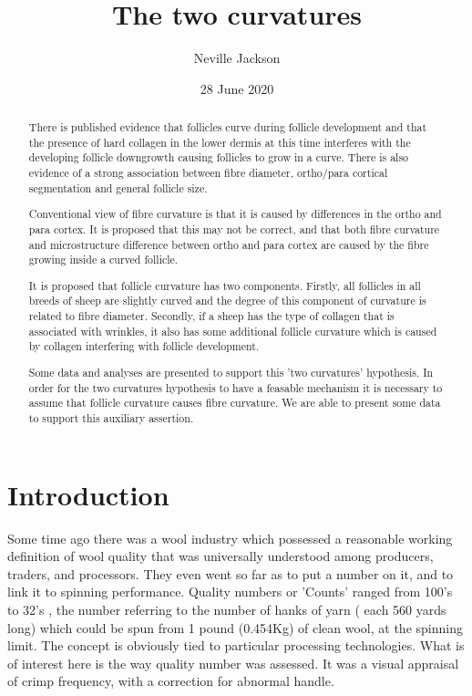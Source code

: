 \documentclass{article}
\begin{document}
\title{The two curvatures}
\author{Neville Jackson}
\date{28 June 2020}

\maketitle

\begin{abstract}

There is published evidence that follicles curve during follicle development and that the presence of hard collagen in the lower dermis at this time interferes with the developing follicle downgrowth causing follicles to grow in a curve.  
 There is also evidence of a strong association between fibre diameter, ortho/para cortical segmentation and general follicle size.

Conventional view of fibre curvature is that it is caused by differences in the ortho and para cortex. It is proposed that this may not be correct, and that both fibre curvature and microstructure difference between ortho and para cortex are caused by the fibre growing inside a curved follicle. 

It is proposed that follicle curvature has two components. Firstly, all follicles in all breeds of sheep are slightly curved and the degree of this component of curvature is related to fibre diameter. Secondly, if a sheep has the type of collagen that is associated with wrinkles, it also has some additional follicle curvature which is caused by collagen interfering with follicle development.

Some data and analyses are presented to support this 'two curvatures' hypothesis. In order for the two curvatures hypothesis to have a feasable mechanism it is necessary to assume that follicle curvature causes fibre curvature. We are able to present some data to support this  auxiliary assertion.
\end{abstract}


\section{Introduction}

Some time ago there was a wool industry which possessed a reasonable working definition of wool quality that was universally understood among producers, traders, and processors. They even went so far as to put a number on it, and to link it to spinning performance. Quality numbers  or 'Counts' ranged from 100's to 32's , the number referring to the number of hanks of yarn ( each 560 yards long)  which could be spun from 1 pound (0.454Kg) of clean wool, at the spinning limit. The concept is obviously tied to particular processing technologies. What is of interest here is the way quality number was assessed.  It was a visual appraisal of crimp frequency, with a correction for abnormal handle.
\end{document}
